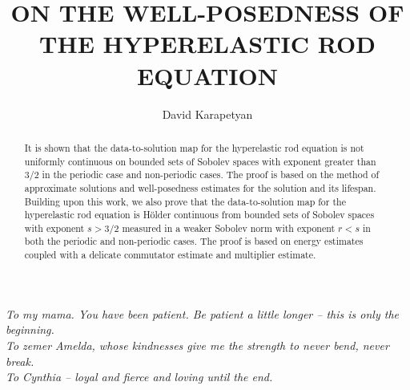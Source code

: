 \documentclass[final,noinfo]{thesis}
\begin{document}
\frontmatter         %
\title{\vspace{0.3in}ON THE WELL-POSEDNESS OF THE HYPERELASTIC ROD EQUATION}
\author{David Karapetyan}
\degprior{}
\maketitle           

\makecopyright      %

\begin{abstract}
It is shown that the data-to-solution map
for the hyperelastic rod equation is not
uniformly continuous on bounded sets of Sobolev spaces with exponent greater
than 3/2 in the periodic case and non-periodic cases. The proof is based on the
method of approximate solutions and well-posedness estimates for the solution
and its lifespan. Building upon this work, we also prove that the data-to-solution map for the hyperelastic rod equation is H\"older continuous from
bounded sets of Sobolev spaces with exponent $s > 3/2$ measured in a weaker
Sobolev norm with exponent $r < s$ in both the periodic and non-periodic cases.
The proof is based on energy estimates coupled with a delicate commutator
estimate and multiplier estimate.
\end{abstract}

\renewcommand{\dedicationname}{\mbox{}} %
 \begin{dedication}
   \emph{To my mama. You have been patient. Be patient a little longer -- this is only the
   beginning. 
   \\
   \vspace{0.2in}
   To zemer Amelda, whose kindnesses
give me the strength to never bend, never break.
\\
\vspace{0.2in}
To Cynthia -- loyal and fierce and loving until the end. 
}
\end{dedication}
\end{document}
